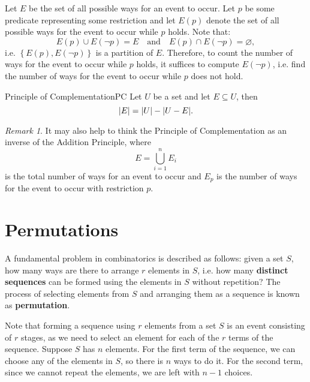 \documentclass[math]{amznotes}
\theoremstyle{remark}
\newtheorem*{remark}{Remark}
\begin{document}
Let $E$ be the set of all possible ways for an event to occur. Let $p$ be some predicate representing some restriction and let $E(p)$ denote the set of all possible ways for the event to occur while $p$ holds. Note that:
\begin{displaymath}
    E(p) \cup E(\neg p) = E \quad \textrm{and} \quad E(p) \cap E(\neg p) = \varnothing,
\end{displaymath}
i.e. $\left\{E(p), E(\neg p)\right\}$ is a partition of $E$. Therefore, to count the number of ways for the event to occur while $p$ holds, it suffices to compute $E(\neg p)$, i.e. find the number of ways for the event to occur while $p$ does not hold.
\begin{thmbox}{Principle of Complementation}{PC}
    Let $U$ be a set and let $E \subseteq U$, then 
    \begin{equation*}
        {\left\lvert {E} \right\rvert} = {\left\lvert {U} \right\rvert} - {\left\lvert {U - E} \right\rvert}.
    \end{equation*}
\end{thmbox}
\begin{notebox}
    \begin{remark}
        It may also help to think the Principle of Complementation as an inverse of the Addition Principle, where
        \begin{displaymath}
            E = \bigcup_{i = 1}^n E_i
        \end{displaymath}
        is the total number of ways for an event to occur and $E_p$ is the number of ways for the event to occur with restriction $p$.
    \end{remark}
\end{notebox}
\section{Permutations}
A fundamental problem in combinatorics is described as follows: given a set $S$, how many ways are there to arrange $r$ elements in $S$, i.e. how many {\color{red} \textbf{distinct sequences}} can be formed using the elements in $S$ without repetition? The process of selecting elements from $S$ and arranging them as a sequence is known as \textbf{permutation}.

Note that forming a sequence using $r$ elements from a set $S$ is an event consisting of $r$ stages, as we need to select an element for each of the $r$ terms of the sequence. Suppose $S$ has $n$ elements. For the first term of the sequence, we can choose any of the elements in $S$, so there is $n$ ways to do it. For the second term, since we cannot repeat the elements, we are left with $n - 1$ choices. 
\end{document}
